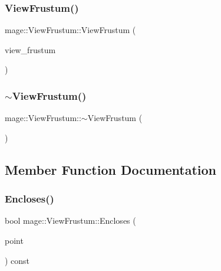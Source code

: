 \subsubsection{\texorpdfstring{View\+Frustum()}{ViewFrustum()}\hspace{0.1cm}{\footnotesize\ttfamily [3/3]}}
{\footnotesize\ttfamily mage\+::\+View\+Frustum\+::\+View\+Frustum (\begin{DoxyParamCaption}\item[{\hyperlink{classmage_1_1_view_frustum}{View\+Frustum} \&\&}]{view\+\_\+frustum }\end{DoxyParamCaption})\hspace{0.3cm}{\ttfamily [default]}}

\hypertarget{classmage_1_1_view_frustum_aaa0e10f5401370909694e923c58323a9}{}\label{classmage_1_1_view_frustum_aaa0e10f5401370909694e923c58323a9} 
\subsubsection{\texorpdfstring{$\sim$\+View\+Frustum()}{~ViewFrustum()}}
{\footnotesize\ttfamily mage\+::\+View\+Frustum\+::$\sim$\+View\+Frustum (\begin{DoxyParamCaption}{ }\end{DoxyParamCaption})\hspace{0.3cm}{\ttfamily [default]}}



\subsection{Member Function Documentation}
\hypertarget{classmage_1_1_view_frustum_a290ee7b311278ed4701203859773aa42}{}\label{classmage_1_1_view_frustum_a290ee7b311278ed4701203859773aa42} 
\subsubsection{\texorpdfstring{Encloses()}{Encloses()}}
{\footnotesize\ttfamily bool mage\+::\+View\+Frustum\+::\+Encloses (\begin{DoxyParamCaption}\item[{const \hyperlink{structmage_1_1_point3}{Point3} \&}]{point }\end{DoxyParamCaption}) const}

